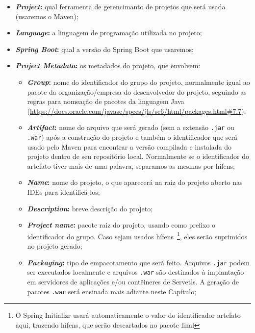\begin{itemize}

    \item \textbf{\textit{Project}:} qual ferramenta de gerencimanto de projetos que será usada (usaremos o Maven);
    
    \item \textbf{\textit{Language}:} a linguagem de programação utilizada no projeto;
    
    \item \textbf{\textit{Spring Boot}:} qual a versão do Spring Boot que usaremos;
    
    \item \textbf{\textit{Project Metadata}:} os metadados do projeto, que envolvem:
    
    \begin{itemize}
    
        \item \textbf{\textit{Group}:} nome do identificador do grupo do projeto, normalmente igual ao pacote da organização/empresa do desenvolvedor do projeto, seguindo as regras para nomeação de pacotes da linguagem Java (\url{https://docs.oracle.com/javase/specs/jls/se6/html/packages.html#7.7});
        
        \item \textbf{\textit{Artifact}:} nome do arquivo que será gerado (sem a extensão \texttt{.jar} ou \texttt{.war}) após a construção do projeto e também o identificador que será usado pelo Maven para encontrar a versão compilada e instalada do projeto dentro de seu repositório local. Normalmente se o identificador do artefato tiver mais de uma palavra, separamos as mesmas por hífens;
        
        \item \textbf{\textit{Name}:} nome do projeto, o que aparecerá na raiz do projeto aberto nas IDEs para identificá-los;
        
        \item \textbf{\textit{Description}:} breve descrição do projeto;
        
        \item \textbf{\textit{Project name}:} pacote raiz do projeto, usando como prefixo o identificador do grupo. Caso sejam usados hífens~\footnote{O Spring Initializr usará automaticamente o valor do identificador artefato aqui, trazendo hífens, que serão descartados no pacote final}, eles serão suprimidos no projeto gerado;
        
        \item \textbf{\textit{Packaging}:} tipo de empacotamento que será feito. Arquivos \texttt{.jar} podem ser executados localmente e arquivos \texttt{.war} são destinados à implantação em servidores de aplicações e/ou contêineres de Servetls. A geração de pacotes \texttt{.war} será ensinada mais adiante neste Capítulo;
        

\end{itemize}
\end{itemize}
